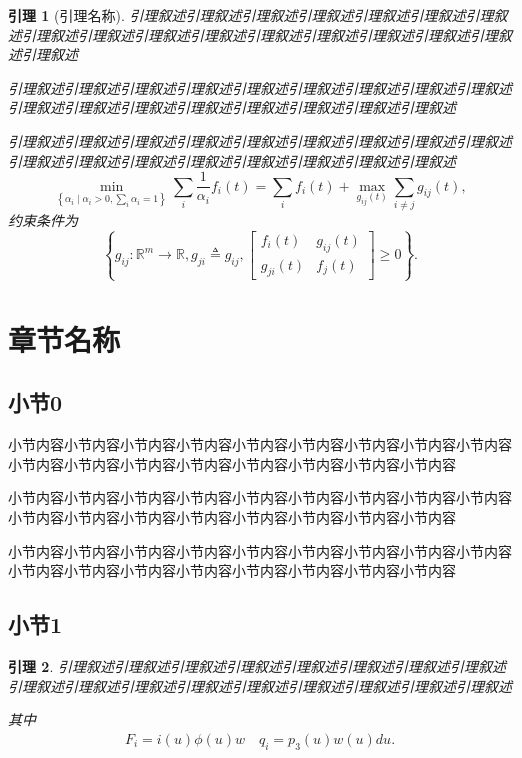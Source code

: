 \documentclass[a4paper, 12pt, oneside]{article}
\theoremstyle{cn_theorem}
\newtheorem{lemma}{引理}[section]   %
\begin{document}
\begin{lemma}[引理名称] \label{引理交叉引用名字}
引理叙述引理叙述引理叙述引理叙述引理叙述引理叙述引理叙述引理叙述引理叙述引理叙述引理叙述引理叙述引理叙述引理叙述引理叙述引理叙述引理叙述

引理叙述引理叙述引理叙述引理叙述引理叙述引理叙述引理叙述引理叙述引理叙述引理叙述引理叙述引理叙述引理叙述引理叙述引理叙述引理叙述引理叙述

引理叙述引理叙述引理叙述引理叙述引理叙述引理叙述引理叙述引理叙述引理叙述引理叙述引理叙述引理叙述引理叙述引理叙述引理叙述引理叙述引理叙述
\begin{equation}
    \min_{\left\{\alpha_i \mid \alpha_i > 0, \sum_i \alpha_i = 1\right\}} \sum_i \frac{1}{\alpha_i} f_i(t) = \sum_i f_i(t) + \max_{g_{ij}(t)} \sum_{i \neq j} g_{ij}(t),
\end{equation}
约束条件为
\begin{equation*}
    \left\{ g_{ij}: \mathbb{R}^m \to \mathbb{R}, g_{ji} \triangleq g_{ij}, \begin{bmatrix} f_i(t) & g_{ij}(t) \\ g_{ji}(t) & f_j(t) \end{bmatrix} \ge 0 \right\}.
\end{equation*}
\end{lemma}

\section{章节名称}

\subsection{小节0}
小节内容小节内容小节内容小节内容小节内容小节内容小节内容小节内容小节内容小节内容小节内容小节内容小节内容小节内容小节内容小节内容小节内容

小节内容小节内容小节内容小节内容小节内容小节内容小节内容小节内容小节内容小节内容小节内容小节内容小节内容小节内容小节内容小节内容小节内容

小节内容小节内容小节内容小节内容小节内容小节内容小节内容小节内容小节内容小节内容小节内容小节内容小节内容小节内容小节内容小节内容小节内容

\subsection{小节1}
\begin{lemma} \label{引理交叉引用名字}
引理叙述引理叙述引理叙述引理叙述引理叙述引理叙述引理叙述引理叙述引理叙述引理叙述引理叙述引理叙述引理叙述引理叙述引理叙述引理叙述引理叙述

其中
\begin{gather*}
    F_i = i(u) \phi(u) w \quad q_i = p_3(u) w(u) du.
\end{gather*}
\end{lemma}
\end{document}
